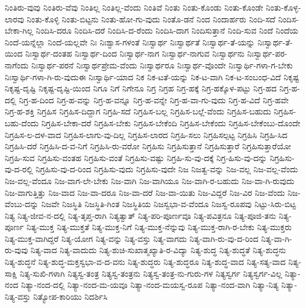{ನಿಂತಿರು-ವುವು
ನಿಂತಿರು-ವೆವು
ನಿಂತಿಲ್ಲ
ನಿಂತಿಲ್ಲ-ವೆಂದು
ನಿಂತಿವೆ
ನಿಂತು
ನಿಂತು-ಕೊಂಡು
ನಿಂತು-ಕೊಂಡೇ
ನಿಂತು-ಕೊಳ್ಳ-ಲಾರವು
ನಿಂತು-ಕೊಳ್ಳಿ
ನಿಂತು-ಬಿಟ್ಟನು
ನಿಂತು-ಹೋ-ಗು-ವುದು
ನಿಂತೊ-ಡನೆ
ನಿಂದ
ನಿಂದಾರ್ಹರು
ನಿಂದಿ-ಸದೆ
ನಿಂದಿಸ-ಬೇಕಾ-ಗಿಲ್ಲ
ನಿಂದಿಸಿ-ದರೂ
ನಿಂದಿಸಿ-ದರೆ
ನಿಂದಿಸಿ-ದ-ರೆಂದು
ನಿಂದಿಸಿ-ದಾಗ
ನಿಂದಿಸುತ್ತಾನೆ
ನಿಂದಿ-ಸುವ
ನಿಂದೆ
ನಿಂದೆಯ
ನಿಂದೆ-ಯನ್ನೆಲ್ಲಾ
ನಿಂದೆ-ಯಲ್ಲವೇ
ನಿಃ
ನಿಃಶ್ವಾಸ-ಗಳಂತೆ
ನಿಃಸ್ವಾರ್ಥ
ನಿಃಸ್ವಾರ್ಥತೆ
ನಿಃಸ್ವಾರ್ಥ-ತೆ-ಯನ್ನು
ನಿಃಸ್ವಾರ್ಥ-ತೆ-ಯಿಂದ
ನಿಃಸ್ವಾರ್ಥ-ದಂತಹ
ನಿಃಸ್ವಾರ್ಥ-ದಿಂದ
ನಿಃಸ್ವಾರ್ಥ-ನಾಗ
ನಿಃಸ್ವಾರ್ಥ-ನಾಗುವ
ನಿಃಸ್ವಾರ್ಥನು
ನಿಃಸ್ವಾರ್ಥ-ಪರ-ನಾಗೆಂದು
ನಿಃಸ್ವಾರ್ಥ-ಪರನೆ
ನಿಃಸ್ವಾರ್ಥಪ್ರೇಮ-ವೆಂದು
ನಿಃಸ್ವಾರ್ಥರೂ
ನಿಃಸ್ವಾರ್ಥ-ವೊಂದೇ
ನಿಃಸ್ವಾರ್ಥಿ-ಗಳಾ-ಗ-ಬೇಕು
ನಿಃಸ್ವಾರ್ಥಿ-ಗಳಾ-ಗಿ-ರು-ವುದುಈ
ನಿಃಸ್ವಾರ್ಥಿ-ಯಾದ
ನಿಕ
ನಿಕ-ಟತೆ-ಯನ್ನು
ನಿಕ-ಟ-ವಾಗಿ
ನಿಕ-ಟ-ಸಂಬಂಧ-ವಿದೆ
ನಿಕೃಷ್ಟ
ನಿಕೃಷ್ಟ-ದೃಷ್ಟಿ
ನಿಕೃಷ್ಟ-ದೃಷ್ಟಿ-ಯಿಂದ
ನಿಗೂ
ನಿಗೆ
ನಿಗೇನೂ
ನಿಗ್ರ
ನಿಗ್ರಹ
ನಿಗ್ರ-ಹಕ್ಕೆ
ನಿಗ್ರ-ಹಕ್ಕೊಳ-ಪಟ್ಟು
ನಿಗ್ರ-ಹದ
ನಿಗ್ರ-ಹ-ದಲ್ಲಿ
ನಿಗ್ರ-ಹ-ದಿಂದ
ನಿಗ್ರ-ಹ-ವನ್ನು
ನಿಗ್ರ-ಹ-ವನ್ನೂ
ನಿಗ್ರ-ಹ-ವನ್ನೇ
ನಿಗ್ರ-ಹ-ವಾ-ಗು-ವುದು
ನಿಗ್ರ-ಹ-ವಿದೆ
ನಿಗ್ರ-ಹವೇ
ನಿಗ್ರ-ಹ-ಶಕ್ತಿ
ನಿಗ್ರಹಿಸ
ನಿಗ್ರಹಿಸ-ದಿದ್ದಾಗ
ನಿಗ್ರಹಿ-ಸದೆ
ನಿಗ್ರಹಿಸ-ಬಲ್ಲ
ನಿಗ್ರಹಿಸ-ಬಲ್ಲೆ-ವೆಂದು
ನಿಗ್ರಹಿಸ-ಬಹುದು
ನಿಗ್ರಹಿಸ-ಬಹು-ದೆಂದು
ನಿಗ್ರಹಿಸ-ಬೇಕಾ-ದರೆ
ನಿಗ್ರಹಿಸ-ಬೇಕು
ನಿಗ್ರಹಿಸ-ಬೇಕೆಂದಿ
ನಿಗ್ರಹಿಸ-ಬೇಕೆಂದು
ನಿಗ್ರಹಿಸ-ಬೇಕೆಂಬು-ದೊಂದೇ
ನಿಗ್ರಹಿಸ-ಲ-ದಳ-ವಾದ
ನಿಗ್ರಹಿಸ-ಲಾಗು-ವು-ದಿಲ್ಲ
ನಿಗ್ರಹಿಸ-ಲಾರದ
ನಿಗ್ರಹಿ-ಸಲು
ನಿಗ್ರಹಿಸಲ್ಪಟ್ಟ
ನಿಗ್ರಹಿಸಿ
ನಿಗ್ರಹಿ-ಸಿದ
ನಿಗ್ರಹಿಸಿ-ದರೆ
ನಿಗ್ರಹಿಸಿ-ದ-ವ-ನಿಗೆ
ನಿಗ್ರಹಿಸಿ-ರು-ವರೋ
ನಿಗ್ರಹಿಸು
ನಿಗ್ರಹಿಸುತ್ತಾನೆ
ನಿಗ್ರಹಿಸುತ್ತಾರೆ
ನಿಗ್ರಹಿಸುತ್ತಾರೆಯೋ
ನಿಗ್ರಹಿ-ಸುವ
ನಿಗ್ರಹಿಸು-ವಂತಹ
ನಿಗ್ರಹಿಸು-ವಂತೆ
ನಿಗ್ರಹಿಸು-ವಷ್ಟು
ನಿಗ್ರಹಿ-ಸು-ವು-ದಕ್ಕೆ
ನಿಗ್ರ-ಹಿಸು-ವು-ದನ್ನು
ನಿಗ್ರಹಿಸು-ವು-ದ-ರಲ್ಲಿ
ನಿಗ್ರಹಿಸು-ವು-ದ-ರಿಂದ
ನಿಗ್ರಹಿಸು-ವುದು
ನಿಗ್ರಹಿಸು-ವುದೇ
ನಿಜ
ನಿಜತ್ವ-ವನ್ನು
ನಿಜ-ವಲ್ಲ
ನಿಜ-ವಲ್ಲ-ವೆಂದು
ನಿಜ-ವಲ್ಲ-ವೆಂದೂ
ನಿಜ-ವಾಗ-ಲೇ-ಬೇಕು
ನಿಜ-ವಾಗಿ
ನಿಜ-ವಾಗಿಯೂ
ನಿಜ-ವಾಗಿ-ರ-ಬಹುದು
ನಿಜ-ವಾ-ಗಿ-ರುವುದು
ನಿಜ-ವಾಗುತ್ತಿತ್ತು
ನಿಜ-ವಾದ
ನಿಜ-ವಾ-ದರೂ
ನಿಜ-ವಾ-ದರೆ
ನಿಜ-ವಾ-ಯಿತು
ನಿಜ-ವಿದ್ದರೆ
ನಿಜ-ವಿರ
ನಿಜ-ವೆಂದು
ನಿಜ-ವೆಂಬು-ದನ್ನು
ನಿಜವೇ
ನಿಜಸ್ಥಿತಿ
ನಿಜಸ್ಥಿತಿ-ಗಿಂತ
ನಿಜಸ್ಥಿತಿಯ
ನಿಜಸ್ವಭಾ-ವ-ವೆಂದೂ
ನಿಜಸ್ವ-ರೂಪವು
ನಿಟ್ಟು-ಸಿರು-ಬಿಟ್ಟ
ನಿತ್ಯ
ನಿತ್ಯ-ಜೀವ-ನ-ದಲ್ಲಿ
ನಿತ್ಯ-ತೃಪ್ತ-ರಾಗಿ
ನಿತ್ಯತ್ವಾತ್
ನಿತ್ಯ-ಪರಿ-ಪೂರ್ಣವೂ
ನಿತ್ಯ-ಪವಿತ್ರನೂ
ನಿತ್ಯ-ಪೂಜಿ-ತನು
ನಿತ್ಯ-ಪೂರ್ಣ
ನಿತ್ಯ-ಮುಕ್ತ
ನಿತ್ಯ-ಮುಕ್ತತೆ
ನಿತ್ಯ-ಮುಕ್ತ-ನಿಗೆ
ನಿತ್ಯ-ಮುಕ್ತ-ನೆನ್ನುವು
ನಿತ್ಯ-ಮುಕ್ತ-ರಾಗಿ-ರ-ಬೇಕು
ನಿತ್ಯ-ಮುಕ್ತರು
ನಿತ್ಯ-ಮುಕ್ತ-ವಾಗಿದ್ದರೆ
ನಿತ್ಯ-ಯೋಗ
ನಿತ್ಯ-ವನ್ನು
ನಿತ್ಯ-ವಸ್ತು
ನಿತ್ಯ-ವಾಗದು
ನಿತ್ಯ-ವಾಗಿ-ರು-ವು-ದ-ರಿಂದ
ನಿತ್ಯ-ವಾ-ಗಿ-ರು-ವುವು
ನಿತ್ಯ-ವಾದ
ನಿತ್ಯ-ವಾದುದು
ನಿತ್ಯ-ಶುಚಿ-ಸುಖಾತ್ಮಖ್ಯಾತಿ-ರ-ವಿದ್ಯಾ
ನಿತ್ಯ-ಶುದ್ಧ
ನಿತ್ಯ-ಶುದ್ಧತೆ
ನಿತ್ಯ-ಶುದ್ಧನು
ನಿತ್ಯ-ಶುದ್ಧನೆ
ನಿತ್ಯ-ಶುದ್ಧ-ಮಕ್ತಸ್ವಭಾ-ವ-ದ-ವನು
ನಿತ್ಯ-ಶುದ್ಧರು
ನಿತ್ಯ-ಶುದ್ಧರೂ
ನಿತ್ಯ-ಶುದ್ಧ-ವಾದ
ನಿತ್ಯ-ಸತ್ಯ-ವಾದ
ನಿತ್ಯ-ಸಾಕ್ಷಿ
ನಿತ್ಯ-ಸುಖಿ-ಗಳಾಗಿ
ನಿತ್ಯಸ್ವ-ತಂತ್ರ
ನಿತ್ಯಸ್ವ-ತಂತ್ರನು
ನಿತ್ಯಸ್ವ-ತಂತ್ರ-ನು-ಗುರು-ಗಳ
ನಿತ್ಯಸ್ವರ್ಗ
ನಿತ್ಯಸ್ವರ್ಗ-ವಿಲ್ಲ
ನಿತ್ಯಾ-ನಂದ
ನಿತ್ಯಾ-ನಂದ-ದಲ್ಲಿ
ನಿತ್ಯಾ-ನಂದ-ಮ-ಯವೂ
ನಿತ್ಯಾ-ನಂದ-ಮಯಸ್ವ-ರೂಪ
ನಿತ್ಯಾ-ನಂದ-ವಾಗಿ
ನಿತ್ಯಾ-ನಿತ್ಯ
ನಿತ್ಯಾ-ನಿತ್ಯ-ವಸ್ತು
ನಿತ್ಯೋಪ-ಕಾರಿಯು
ನಿದರ್ಶಿಸಿ
}

